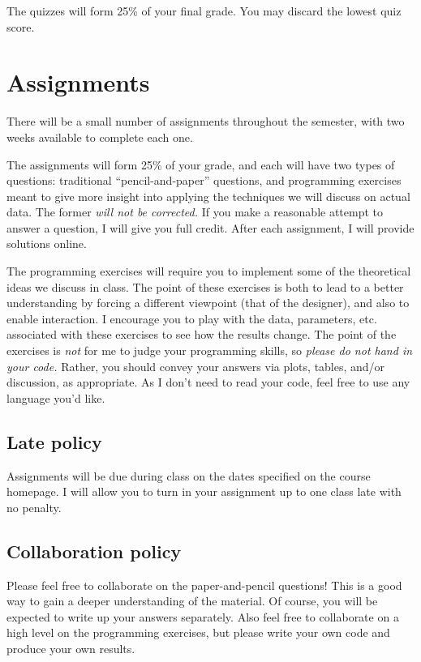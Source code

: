 \documentclass{article}
\begin{document}
The quizzes will form 25\% of your final grade. You may discard the lowest quiz
score.

\section*{Assignments}

There will be a small number of assignments throughout the semester, with two
weeks available to complete each one.

The assignments will form 25\% of your grade, and each will have two types of
questions: traditional ``pencil-and-paper'' questions, and programming exercises
meant to give more insight into applying the techniques we will discuss on
actual data.  The former \emph{will not be corrected.}  If you make a reasonable
attempt to answer a question, I will give you full credit.  After each
assignment, I will provide solutions online.

The programming exercises will require you to implement some of the theoretical
ideas we discuss in class.  The point of these exercises is both to lead to a
better understanding by forcing a different viewpoint (that of the designer),
and also to enable interaction.  I encourage you to play with the data,
parameters, etc. associated with these exercises to see how the results change.
The point of the exercises is \emph{not} for me to judge your programming
skills, so \emph{please do not hand in your code.}  Rather, you should convey
your answers via plots, tables, and/or discussion, as appropriate.  As I don't
need to read your code, feel free to use any language you'd like.

\subsection*{Late policy}

Assignments will be due during class on the dates specified on the course
homepage.  I will allow you to turn in your assignment up to one class late with
no penalty.

\subsection*{Collaboration policy}

Please feel free to collaborate on the paper-and-pencil questions!  This is a
good way to gain a deeper understanding of the material.  Of course, you will be
expected to write up your answers separately.  Also feel free to collaborate on
a high level on the programming exercises, but please write your own code and
produce your own results.
\end{document}
